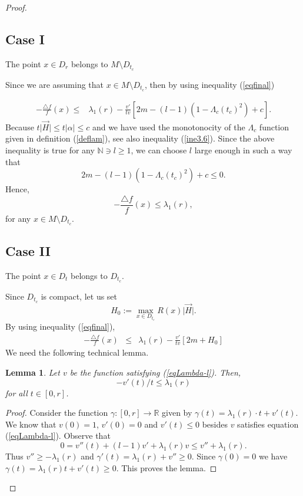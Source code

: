 \documentclass[a4paper]{amsart}
\newtheorem{lemma}[theorem]{Lemma}
\theoremstyle{definition}
\numberwithin{equation}{section}
\begin{document}
\begin{proof}
\subsection*{Case I} The point $x\in D_r$ belongs to $M\setminus D_{t_c}$

Since we are assuming that $x\in M\setminus D_{t_c}$, then by using inequality (\ref{eqfinal})

\begin{equation}
\begin{aligned}
-\frac{\triangle f}{f}(x) \leq &\lambda_{1}(r) -\frac{v'}{tv}\left[2m-(l-1)(1-\Lambda_c(t_c)^2)+c\right].
\end{aligned}
\end{equation}
Because $t\vert\vec H\vert\leq t\vert \alpha\vert\leq c$ and we have used the monotonocity of the $\Lambda_c$ function given in definition (\ref{deflam}), see also inequality (\ref{ine3.6}).
Since the above inequality is true for any $\mathbb{N}\ni l\geq 1$, we can choose $l$ large enough in such a way that 
$$2m-(l-1)(1-\Lambda_c(t_c)^2)+c\leq 0.$$
 Hence,
\begin{equation}
-\frac{\triangle f}{f}(x) \leq \lambda_{1}(r),
\end{equation} 
for any $x\in M\setminus D_{t_c}$.

\subsection*{Case II}The point $x\in D_t$ belongs to $D_{t_c}$.

Since $D_{t_c}$ is compact, let us set
\begin{equation}
H_0:=\max_{x\in D_{t_c}}R(x)\vert \vec H\vert.
\end{equation}
By using inequality (\ref{eqfinal}),
\begin{eqnarray}\label{eqfinal2}-\frac{\triangle f}{f}(x)&\leq &\lambda_{1}(r)-\frac{v'}{tv}\left[2m+H_0\right]
\end{eqnarray} 
 We need the following technical lemma.
 \begin{lemma}\label{lemma2}
 Let $v$ be the function satisfying (\ref{eqLambda-l}).   Then,  
$$
-v'(t)/t \leq \lambda_{1}(r)
$$ for all $t\in [0,r]$.
 \end{lemma}
\begin{proof}Consider the function $\gamma:[0,r]\to \mathbb{R}$ given by
$\gamma(t)=\lambda_1(r) \cdot t + v'(t)$. We know that $v(0)=1$, $v'(0)=0$ and $v'(t)\leq 0$ besides $v$ satisfies equation (\ref{eqLambda-l}). Observe that \[0=v''(t)+(l-1)v'+\lambda_1(r) v\leq v'' +\lambda_1(r).\] Thus $v''\geq -\lambda_1(r)$ and $\gamma'(t)=\lambda_1(r) +v''\geq 0$. Since $\gamma(0)=0$ we have $\gamma(t)=\lambda_1(r) t+v'(t)\geq 0$. This proves the lemma.\end{proof}


\end{proof}
\end{document}

